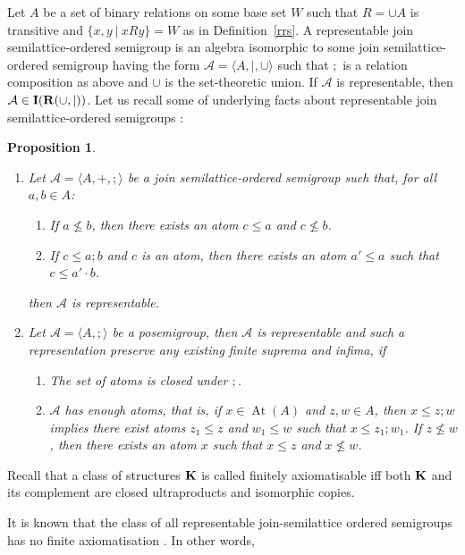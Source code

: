 \documentclass[a4paper]{article}
\theoremstyle{defin}
\theoremstyle{theorem}
\theoremstyle{prop}
\newtheorem{prop}{Proposition}
\theoremstyle{lemma}
\theoremstyle{ex}
\theoremstyle{col}
\begin{document}
Let $A$ be a set of binary relations on some base set $W$ such that $R = \cup A$ is transitive and $\{ x, y \: | \: x R y \} = W$ as in Definition~\ref{rrs}. A representable join semilattice-ordered semigroup is an algebra isomorphic to some join semilattice-ordered semigroup having the form $\mathcal{A} = \langle A, |, \cup \rangle$ such that $;$ is a relation composition as above and $\cup$ is the set-theoretic union. If $\mathcal{A}$ is representable, then $\mathcal{A} \in {\bf I}({\bf R}(\cup, |))$. Let us recall some of underlying facts about representable join semilattice-ordered semigroups \cite{andreka1991representations}:

\begin{prop}
  $ $

  \begin{enumerate}
    \item Let $\mathcal{A} = \langle A, +, ; \rangle$ be a join semilattice-ordered semigroup such that, for all $a, b \in A$:
    \begin{enumerate}
      \item If $a \nleq b$, then there exists an atom $c \leq a$ and $c \nleq b$.
      \item If $c \leq a ; b$ and $c$ is an atom, then there exists an atom $a' \leq a$ such that $c \leq a' \cdot b$.
    \end{enumerate}
    then $\mathcal{A}$ is representable.
    \item Let $\mathcal{A} = \langle A, ; \rangle$ be a posemigroup, then $\mathcal{A}$ is representable and such a representation preserve any existing finite suprema and infima, if
    \begin{enumerate}
      \item The set of atoms is closed under $;$.
      \item $\mathcal{A}$ has enough atoms, that is, if $x \in \operatorname{At}(A)$ and $z, w \in A$, then $x \leq z ; w$ implies there exist atoms $z_1 \leq z$ and $w_1 \leq w$ such that $x \leq z_1 ; w_1$. If $z \nleq w$, then there exists an atom $x$ such that $x \leq z$ and $x \nleq w$.
    \end{enumerate}
  \end{enumerate}
\end{prop}

Recall that a class of structures ${\bf K}$ is called finitely axiomatisable iff both ${\bf K}$ and its complement are closed
ultraproducts and isomorphic copies.

It is known that the class of all representable join-semilattice ordered semigroups has no finite axiomatisation \cite{andreka1989union}. In other words,
\end{document}

